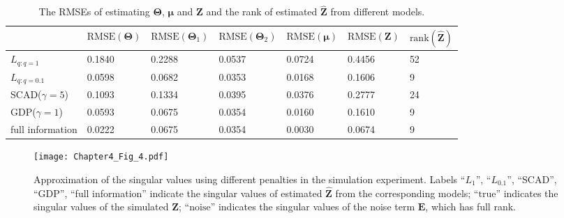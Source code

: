 \begin{table}[htbp]
\centering
\caption{The RMSEs of estimating $\mathbf{\Theta}$, $\bm{\mu}$ and $\mathbf{Z}$ and the rank of estimated $\hat{\mathbf{Z}}$ from different models.}
\label{chapter4_tab:1}
\begin{tabular}{|l|l|l|l|l|l|l|}
 \hline
    & $\text{RMSE}(\mathbf{\Theta})$ & $\text{RMSE}(\mathbf{\Theta}_1)$ & $\text{RMSE}(\mathbf{\Theta}_2)$ & $\text{RMSE}(\bm{\mu})$ & $\text{RMSE}(\mathbf{Z})$ & $\text{rank}(\hat{\mathbf{Z}})$\\
 \hline
  $L_{q:q=1}$   & 0.1840 & 0.2288 & 0.0537 & 0.0724 & 0.4456 & 52 \\
  $L_{q:q=0.1}$ & 0.0598 & 0.0682 & 0.0353 & 0.0168 & 0.1606 & 9\\
  SCAD($\gamma=5$) & 0.1093 & 0.1334 & 0.0395 & 0.0376 & 0.2777 & 24 \\
  GDP($\gamma=1$) & 0.0593 & 0.0675 & 0.0354 & 0.0160 & 0.1610 & 9 \\
  full information & 0.0222 & 0.0675 & 0.0354 & 0.0030 & 0.0674 & 9 \\
  \hline
\end{tabular}
\end{table}

\begin{figure}[htbp]
    \centering
    \texttt{[image: Chapter4\_Fig\_4.pdf]}
    \caption{Approximation of the singular values using different penalties in the simulation experiment. Labels ``$L_1$'', ``$L_{0.1}$'', ``SCAD'', ``GDP'', ``full information'' indicate the singular values of estimated $\hat{\mathbf{Z}}$ from the corresponding models; ``$\text{true}$'' indicates the singular values of the simulated $\mathbf{Z}$; ``$\text{noise}$'' indicates the singular values of the noise term $\mathbf{E}$, which has full rank.}
    \label{chapter4_fig:4}
\end{figure}

